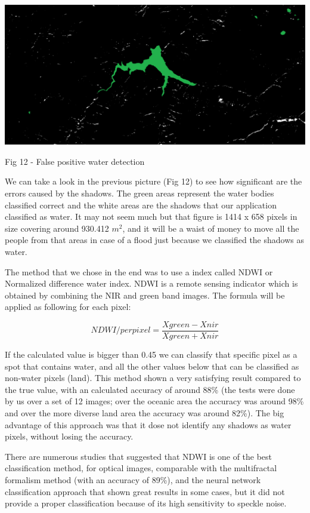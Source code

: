 \documentclass[12pt, a4paper]{report}
\begin{document}
\bigskip
\includegraphics[scale=0.4, left]{water-false-positive.png}
\begin{center}
Fig 12 - False positive water detection
\end{center}
\par 

We can take a look in the previous picture (Fig 12) to see how significant are the errors caused by the shadows. The green areas represent the water bodies classified correct and the white areas are the shadows that our application classified as water. It may not seem much but that figure is 1414 x 658 pixels in size covering around 930.412 $m^2$, and it will be a waist of money to move all the people from that areas in case of a flood just because we classified the shadows as water.
\par 

The method that we chose in the end was to use a index called NDWI or Normalized difference water index. NDWI is a remote sensing indicator which is obtained by combining the NIR and green band images. The formula will be applied as following for each pixel:

$$ NDWI/perpixel = \frac{Xgreen - Xnir}{Xgreen + Xnir}$$

If the calculated value is bigger than 0.45 we can classify that specific pixel as a spot that contains water, and all the other values below that can be classified as non-water pixels (land). This method shown a very satisfying result compared to the true value, with an calculated accuracy of around 88\% (the tests were done by us over a set of 12 images; over the oceanic area the accuracy was around 98\% and over the more diverse land area the accuracy was around 82\%). The big advantage of this approach was that it dose not identify any shadows as water pixels, without losing the accuracy. 
\par 
There are numerous studies \cite{NDWI, NDWI Comparison} that suggested that NDWI is one of the best classification method, for optical images, comparable with the multifractal formalism method (with an accuracy of 89\%), and the neural network classification approach that shown great results in some cases, but it did not provide a proper classification because of its high sensitivity to speckle noise.
\end{document}

